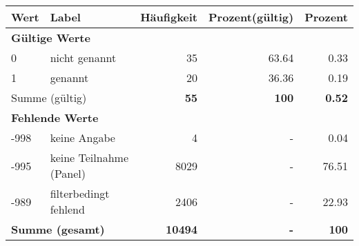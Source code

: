      \begin{longtable}{lXrrr}
     \toprule
     \textbf{Wert} & \textbf{Label} & \textbf{Häufigkeit} & \textbf{Prozent(gültig)} & \textbf{Prozent} \\
     \endhead
     \midrule
     \multicolumn{5}{l}{\textbf{Gültige Werte}}\\

     0 &
     \multicolumn{1}{X}{ nicht genannt   } &


       \num{35} &
       \num[round-mode=places,round-precision=2]{63.64} &
         \num[round-mode=places,round-precision=2]{0.33} \\

     1 &
     \multicolumn{1}{X}{ genannt   } &


       \num{20} &
       \num[round-mode=places,round-precision=2]{36.36} &
         \num[round-mode=places,round-precision=2]{0.19} \\
     \midrule
     \multicolumn{2}{l}{Summe (gültig)} &
       \textbf{\num{55}} &
     \textbf{\num{100}} &
       \textbf{\num[round-mode=places,round-precision=2]{0.52}} \\
     \multicolumn{5}{l}{\textbf{Fehlende Werte}}\\
       -998 &
       keine Angabe &
         \num{4} &
        - &
         \num[round-mode=places,round-precision=2]{0.04} \\
       -995 &
       keine Teilnahme (Panel) &
         \num{8029} &
        - &
         \num[round-mode=places,round-precision=2]{76.51} \\
       -989 &
       filterbedingt fehlend &
         \num{2406} &
        - &
         \num[round-mode=places,round-precision=2]{22.93} \\
     \midrule
     \multicolumn{2}{l}{\textbf{Summe (gesamt)}} &
          \textbf{\num{10494}} &
        \textbf{-} &
        \textbf{\num{100}} \\
     \bottomrule
     \end{longtable}
     
